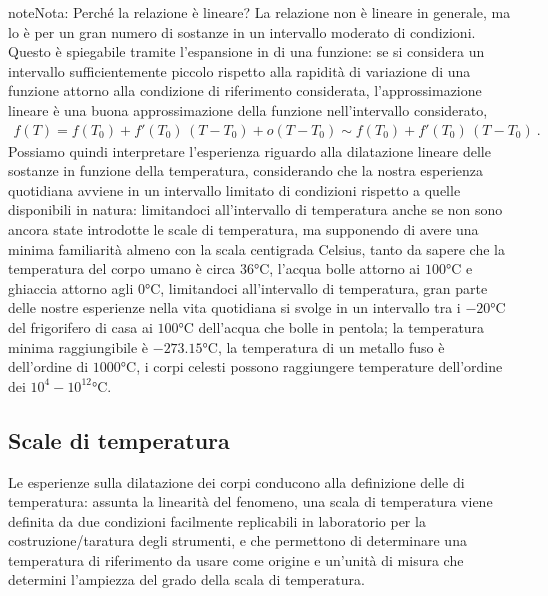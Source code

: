 \documentclass[letterpaper,10pt,italian]{jupyterBook}
\begin{document}
\begin{sphinxadmonition}{note}{Nota:}
\sphinxAtStartPar
Perché la relazione è lineare?
La relazione non è lineare in generale, ma lo è per un gran numero di sostanze in un intervallo moderato di condizioni. Questo è spiegabile tramite l’espansione in  di una funzione: se si considera un intervallo sufficientemente piccolo rispetto alla rapidità di variazione di una funzione attorno alla condizione di riferimento considerata, l’approssimazione lineare è una buona approssimazione della funzione nell’intervallo considerato,
\begin{equation*}
\begin{split}f(T) = f(T_0) + f'(T_0) \, ( T - T_0 ) + o(T-T_0) \sim f(T_0) + f'(T_0) \, ( T - T_0 ) \ .\end{split}
\end{equation*}
\sphinxAtStartPar
Possiamo quindi interpretare l’esperienza riguardo alla dilatazione lineare delle sostanze in funzione della temperatura, considerando che la nostra esperienza quotidiana avviene in un intervallo limitato di condizioni rispetto a quelle disponibili in natura: limitandoci all’intervallo di temperatura anche se non sono ancora state introdotte le scale di temperatura, ma supponendo di avere una minima familiarità almeno con la scala centigrada Celsius, tanto da sapere che la temperatura del corpo umano è circa \(36\text{°C}\), l’acqua bolle attorno ai \(100\text{°C}\) e ghiaccia attorno agli \(0\text{°C}\), limitandoci all’intervallo di temperatura, gran parte delle nostre esperienze nella vita quotidiana si svolge in un intervallo tra i \(-20\text{°C}\) del frigorifero di casa ai \(100\text{°C}\) dell’acqua che bolle in pentola; la temperatura minima raggiungibile è \(-273.15\text{°C}\), la temperatura di un metallo fuso è dell’ordine di \(1000\text{°C}\), i corpi celesti possono raggiungere temperature dell’ordine dei \(10^4-10^{12}\text{°C}\).
\end{sphinxadmonition}


\subsection{Scale di temperatura}
\label{\detokenize{ch/thermodynamics/foundation-experiments:scale-di-temperatura}}
\sphinxAtStartPar
{} Le esperienze sulla dilatazione dei corpi conducono alla definizione delle  di temperatura: assunta la linearità del fenomeno, una scala di temperatura viene definita da due condizioni facilmente replicabili in laboratorio per la costruzione/taratura degli strumenti, e che permettono di determinare una temperatura di riferimento da usare come origine e un’unità di misura che determini l’ampiezza del grado della scala di temperatura.
\end{document}
